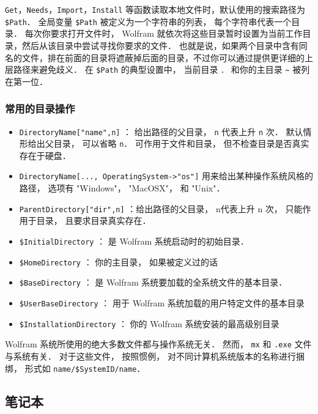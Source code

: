 \verb`Get`，\verb`Needs`，\verb`Import`，\verb`Install` 等函数读取本地文件时，默认使用的搜索路径为 \verb`$Path`．
全局变量 \verb`$Path` 被定义为一个字符串的列表， 每个字符串代表一个目录．
每次你要求打开文件时， Wolfram 就依次将这些目录暂时设置为当前工作目录，然后从该目录中尝试寻找你要求的文件．
也就是说，如果两个目录中含有同名的文件，排在前面的目录将遮蔽掉后面的目录，不过你可以通过提供更详细的上层路径来避免歧义．
在 \verb`$Path` 的典型设置中， 当前目录 \verb`．` 和你的主目录 \verb`~` 被列在第一位．

\subsubsection{常用的目录操作}

\begin{itemize}
\item \verb`DirectoryName["name",n]` ： 给出路径的父目录， \verb`n` 代表上升 \verb`n` 次． 
默认情形给出父目录， 可以省略 \verb`n`． 可作用于文件和目录， 但不检查目录是否真实存在于硬盘．
\item \verb`DirectoryName[..., OperatingSystem->"os"]` 用来给出某种操作系统风格的路径， 
选项有 "Windows"， "MacOSX"， 和 "Unix"．
\item \verb`ParentDirectory["dir",n]` ：给出路径的父目录， n代表上升 n 次， 
只能作用于目录， 且要求目录真实存在．
\end{itemize}

\begin{itemize}
\item \verb`$InitialDirectory` ：  是 Wolfram 系统启动时的初始目录．
\item \verb`$HomeDirectory` ：  你的主目录， 如果被定义过的话
\item \verb`$BaseDirectory` ：  是 Wolfram 系统要加载的全系统文件的基本目录．
\item \verb`$UserBaseDirectory` ：  用于 Wolfram 系统加载的用户特定文件的基本目录
\item \verb`$InstallationDirectory` ：  你的 Wolfram 系统安装的最高级别目录
\end{itemize}

Wolfram 系统所使用的绝大多数文件都与操作系统无关． 然而， \verb`mx` 和 \verb`.exe` 文件与系统有关．
对于这些文件， 按照惯例， 对不同计算机系统版本的名称进行捆绑， 形式如 \verb`name/$SystemID/name`．

\subsection{笔记本}

